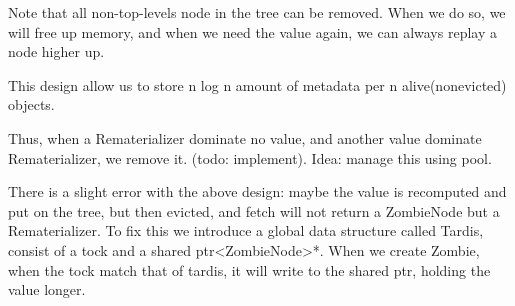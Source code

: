 \documentclass[acmsmall]{acmart}
\begin{document}
	Note that all non-top-levels node in the tree can be removed. When we do so, we will free up memory, and when we need the value again, we can always replay a node higher up.
	
	This design allow us to store n log n amount of metadata per n alive(nonevicted) objects.
	
	Thus, when a Rematerializer dominate no value, and another value dominate Rematerializer, we remove it. (todo: implement). Idea: manage this using pool.
	
	There is a slight error with the above design: maybe the value is recomputed and put on the tree, but then evicted, and fetch will not return a ZombieNode but a Rematerializer. To fix this we introduce a global data structure called Tardis, consist of a tock and a shared ptr<ZombieNode>*. When we create Zombie, when the tock match that of tardis, it will write to the shared ptr, holding the value longer.
	
\appendix
\end{document}
